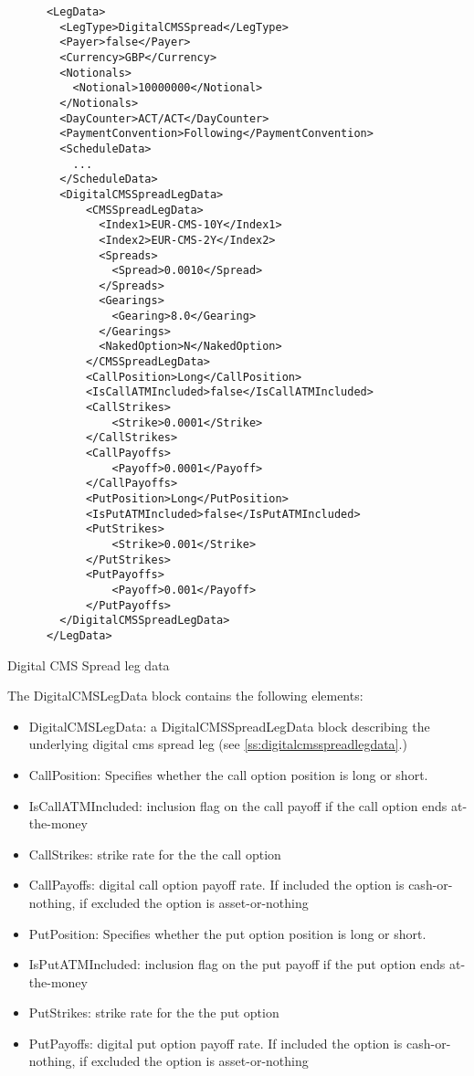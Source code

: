 \begin{listing}[H]
\begin{verbatim}
      <LegData>
        <LegType>DigitalCMSSpread</LegType>
        <Payer>false</Payer>
        <Currency>GBP</Currency>
        <Notionals>
          <Notional>10000000</Notional>
        </Notionals>
        <DayCounter>ACT/ACT</DayCounter>
        <PaymentConvention>Following</PaymentConvention>
        <ScheduleData>
          ...
        </ScheduleData>
        <DigitalCMSSpreadLegData>
            <CMSSpreadLegData>
              <Index1>EUR-CMS-10Y</Index1>
              <Index2>EUR-CMS-2Y</Index2>
              <Spreads>
                <Spread>0.0010</Spread>
              </Spreads>
              <Gearings>
                <Gearing>8.0</Gearing>
              </Gearings>
              <NakedOption>N</NakedOption>
            </CMSSpreadLegData>
            <CallPosition>Long</CallPosition>
            <IsCallATMIncluded>false</IsCallATMIncluded>
            <CallStrikes>
                <Strike>0.0001</Strike>
            </CallStrikes>
            <CallPayoffs>
                <Payoff>0.0001</Payoff>
            </CallPayoffs>
            <PutPosition>Long</PutPosition>
            <IsPutATMIncluded>false</IsPutATMIncluded>
            <PutStrikes>
                <Strike>0.001</Strike>
            </PutStrikes>
            <PutPayoffs>
                <Payoff>0.001</Payoff>
            </PutPayoffs>
        </DigitalCMSSpreadLegData>
      </LegData>
\end{verbatim}
\caption{Digital CMS Spread leg data}
\label{lst:digitalcmsspreadlegdata}
\end{listing}

The DigitalCMSLegData block contains the following elements:

\begin{itemize}
\item DigitalCMSLegData: a DigitalCMSSpreadLegData block describing the underlying digital cms spread leg (see \ref{ss:digitalcmsspreadlegdata}.)
\item CallPosition: Specifies whether the call option position is long  or
  short.
\item IsCallATMIncluded: inclusion flag on the call payoff if the call option ends at-the-money
\item CallStrikes: strike rate for the the call option
\item CallPayoffs: digital call option payoff rate. If included the option is cash-or-nothing, if excluded the option is asset-or-nothing
\item PutPosition: Specifies whether the put option position is long  or short.
\item IsPutATMIncluded: inclusion flag on the put payoff if the put option ends at-the-money
\item PutStrikes: strike rate for the the put option
\item PutPayoffs: digital put option payoff rate. If included the option is cash-or-nothing, if excluded the option is asset-or-nothing
\end{itemize}


